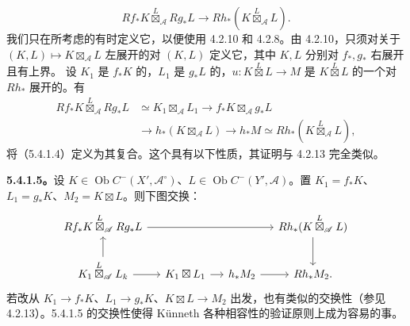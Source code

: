 \begin{equation}\tag{5.4.1.4}
 Rf_*K\overset L\boxtimes_{\mathscr A}Rg_*L\longrightarrow Rh_*(K\overset L\boxtimes_{\mathscr A}L).
\end{equation}
我们只在所考虑的有时定义它，以便使用 4.2.10 和 4.2.8。由 4.2.10，只须对关于 $(K,L)\mapsto K\boxtimes_{\mathscr A}L$ 左展开的对 $(K,L)$ 定义它，其中 $K,L$ 分别对 $f_*,g_*$ 右展开且有上界。
设 $K_1$ 是 $f_*K$ 的，$L_1$ 是 $g_*L$ 的，$u:K\overset L\boxtimes L\to M$ 是 $K\overset L\boxtimes L$ 的一个对 $Rh_*$ 展开的。有
\[\begin{aligned}
Rf_*K\overset L\boxtimes_{\mathscr A}Rg_*L&\simeq K_1\boxtimes_{\mathscr A}L_1\longrightarrow f_*K\boxtimes_{\mathscr A}g_*L\\
&\longrightarrow h_*(K\boxtimes_{\mathscr A}L)\longrightarrow h_*M\simeq Rh_*(K\overset L\boxtimes_{\mathscr A}L),
\end{aligned}\]
将（5.4.1.4）定义为其复合。这个具有以下性质，其证明与 4.2.13 完全类似。

\textbf{5.4.1.5。}设 $K\in\operatorname{Ob}C^-(X',\mathscr A^\circ)$、$L\in\operatorname{Ob}C^-(Y',\mathscr A)$。置 $K_1=f_*K$、$L_1=g_*K$、$M_2=K\boxtimes L$。则下图交换：
\[\begin{tikzcd}[column sep=small]
Rf_*K\overset L\boxtimes_{\mathscr A}Rg_*L\arrow[rrr]&&&Rh_*(K\overset L\boxtimes_{\mathscr A}L)\arrow[d]\\
K_1\overset L\boxtimes_{\mathscr A}L_k\arrow[u]\arrow[r]&K_1\boxtimes L_1\arrow[r]&h_*M_2\arrow[r]&Rh_*M_2 .
\end{tikzcd}\]
若改从 $K_1\to f_*K$、$L_1\to g_*K$、$K\boxtimes L\to M_2$ 出发，也有类似的交换性（参见 4.2.13）。5.4.1.5 的交换性使得 Künneth 各种相容性的验证原则上成为容易的事。

